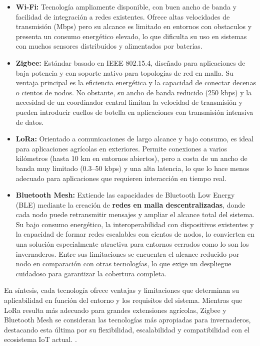 \begin{itemize}
    \item \textbf{Wi-Fi:} Tecnología ampliamente disponible, con buen ancho de banda y facilidad de integración a redes existentes. Ofrece altas velocidades de transmisión (Mbps) pero su alcance es limitado en entornos con obstaculos y presenta un consumo energético elevado, lo que dificulta su uso en sistemas con muchos sensores distribuidos y alimentados por baterías. 
    
    \item \textbf{Zigbee:} Estándar basado en IEEE 802.15.4, diseñado para aplicaciones de baja potencia y con soporte nativo para topologías de red en malla. Su ventaja principal es la eficiencia energética y la capacidad de conectar decenas o cientos de nodos. No obstante, su ancho de banda reducido (250 kbps) y la necesidad de un coordinador central limitan la velocidad de transmisión y pueden introducir cuellos de botella en aplicaciones con transmisión intensiva de datos.
   
    \item \textbf{LoRa:} Orientado a comunicaciones de largo alcance y bajo consumo, es ideal para aplicaciones agrícolas en exteriores. Permite conexiones a varios kilómetros (hasta 10 km en entornos abiertos), pero a costa de un ancho de banda muy limitado (0.3–50 kbps) y una alta latencia, lo que lo hace menos adecuado para aplicaciones que requieren interacción en tiempo real.   
   
    \item \textbf{Bluetooth Mesh:} Extiende las capacidades de Bluetooth Low Energy (BLE) mediante la creación de \textbf{redes en malla descentralizadas}, donde cada nodo puede retransmitir mensajes y ampliar el alcance total del sistema. Su bajo consumo energético, la interoperabilidad con dispositivos existentes y la capacidad de formar redes escalables con cientos de nodos, lo convierten en una solución especialmente atractiva para entornos cerrados como lo son los invernaderos. Entre sus limitaciones se encuentra el alcance reducido por nodo en comparación con otras tecnologías, lo que exige un despliegue cuidadoso para garantizar la cobertura completa.    
\end{itemize}

En síntesis, cada tecnología ofrece ventajas y limitaciones que determinan su aplicabilidad en función del entorno y los requisitos del sistema. Mientras que LoRa resulta más adecuado para grandes extensiones agrícolas, Zigbee y Bluetooth Mesh se consideran las tecnologías más apropiadas para invernaderos, destacando esta última por su flexibilidad, escalabilidad y compatibilidad con el ecosistema IoT actual.  \cite{zigbee_spec, lora_alliance, ieee_wifi, bluetooth_mesh_spec}.

